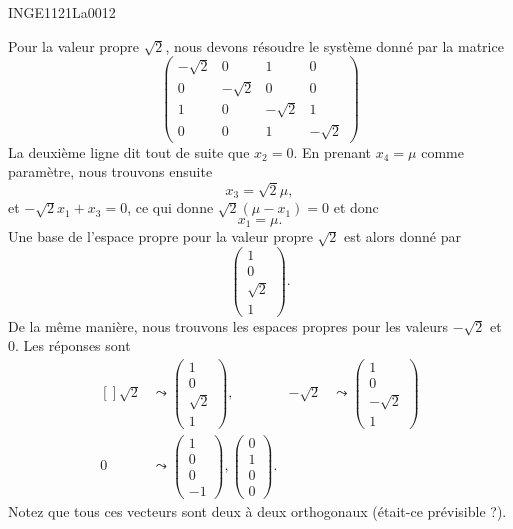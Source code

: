 \begin{corrige}{INGE1121La0012}
\begin{enumerate}
			Pour la valeur propre $\sqrt{2}$, nous devons résoudre le système donné par la matrice
			\begin{equation}
				\begin{pmatrix}
					-\sqrt{2}	&	0	&	1	&	0	\\
					0	&	-\sqrt{2}	&	0	&	0	\\
					1	&	0	&	-\sqrt{2}	&	1	\\ 
					0	&	0	&	1	&	-\sqrt{2}	 
					  \end{pmatrix}
			\end{equation}
			La deuxième ligne dit tout de suite que $x_2=0$. En prenant $x_4=\mu$ comme paramètre, nous trouvons ensuite
			\begin{equation}
				x_3=\sqrt{2}\mu,
			\end{equation}
			et $-\sqrt{2}x_1+x_3=0$, ce qui donne $\sqrt{2}(\mu-x_1)=0$ et donc
			\begin{equation}
				x_1=\mu.
			\end{equation}
			Une base de l'espace propre pour la valeur propre $\sqrt{2}$ est alors donné par
			\begin{equation}
				\begin{pmatrix}
					1	\\ 
					0	\\ 
					\sqrt{2}	\\ 
					1	
				\end{pmatrix}.
			\end{equation}
			De la même manière, nous trouvons les espaces propres pour les valeurs $-\sqrt{2}$ et $0$. Les réponses sont
			\begin{equation}
				\begin{aligned}[]
					\sqrt{2}&\leadsto \begin{pmatrix}
						1	\\ 
						0	\\ 
						\sqrt{2}	\\ 
						1	
					\end{pmatrix},
					&
					-\sqrt{2}&\leadsto\begin{pmatrix}
						1	\\ 
						0	\\ 
						-\sqrt{2}	\\ 
						1	
					\end{pmatrix}\\
					0&\leadsto\begin{pmatrix}
						1	\\ 
						0	\\ 
						0	\\ 
						-1	
					\end{pmatrix},
					\begin{pmatrix}
						0	\\ 
						1	\\ 
						0	\\ 
						0	
					\end{pmatrix}.
				\end{aligned}
			\end{equation}
			Notez que tous ces vecteurs sont deux à deux orthogonaux (était-ce prévisible ?).


\end{enumerate}
\end{corrige}
